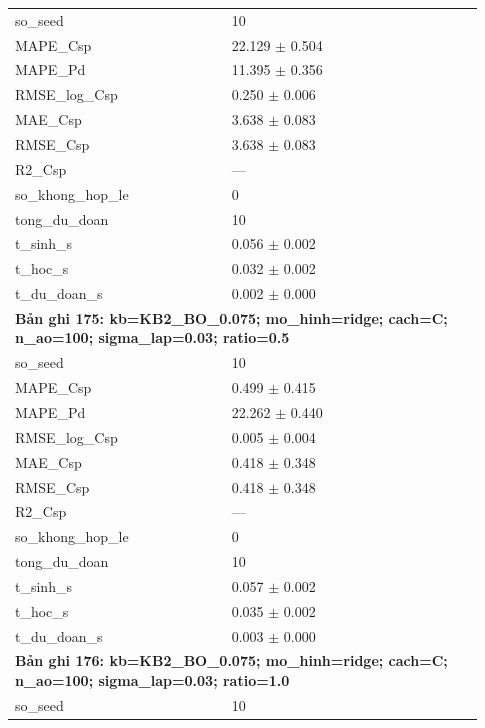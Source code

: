\begin{longtable}{p{0.43\linewidth}p{0.50\linewidth}}
so\_\allowbreak seed & 10 \\
MAPE\_\allowbreak Csp & 22.129 $\pm$ 0.504 \\
MAPE\_\allowbreak Pd & 11.395 $\pm$ 0.356 \\
RMSE\_\allowbreak log\_\allowbreak Csp & 0.250 $\pm$ 0.006 \\
MAE\_\allowbreak Csp & 3.638 $\pm$ 0.083 \\
RMSE\_\allowbreak Csp & 3.638 $\pm$ 0.083 \\
R2\_\allowbreak Csp & — \\
so\_\allowbreak khong\_\allowbreak hop\_\allowbreak le & 0 \\
tong\_\allowbreak du\_\allowbreak doan & 10 \\
t\_\allowbreak sinh\_\allowbreak s & 0.056 $\pm$ 0.002 \\
t\_\allowbreak hoc\_\allowbreak s & 0.032 $\pm$ 0.002 \\
t\_\allowbreak du\_\allowbreak doan\_\allowbreak s & 0.002 $\pm$ 0.000 \\
\midrule
\multicolumn{2}{p{0.95\linewidth}}{\textbf{Bản ghi 175: kb=KB2\_BO\_0.075; mo\_hinh=ridge; cach=C; n\_ao=100; sigma\_lap=0.03; ratio=0.5}} \\
so\_\allowbreak seed & 10 \\
MAPE\_\allowbreak Csp & 0.499 $\pm$ 0.415 \\
MAPE\_\allowbreak Pd & 22.262 $\pm$ 0.440 \\
RMSE\_\allowbreak log\_\allowbreak Csp & 0.005 $\pm$ 0.004 \\
MAE\_\allowbreak Csp & 0.418 $\pm$ 0.348 \\
RMSE\_\allowbreak Csp & 0.418 $\pm$ 0.348 \\
R2\_\allowbreak Csp & — \\
so\_\allowbreak khong\_\allowbreak hop\_\allowbreak le & 0 \\
tong\_\allowbreak du\_\allowbreak doan & 10 \\
t\_\allowbreak sinh\_\allowbreak s & 0.057 $\pm$ 0.002 \\
t\_\allowbreak hoc\_\allowbreak s & 0.035 $\pm$ 0.002 \\
t\_\allowbreak du\_\allowbreak doan\_\allowbreak s & 0.003 $\pm$ 0.000 \\
\midrule
\multicolumn{2}{p{0.95\linewidth}}{\textbf{Bản ghi 176: kb=KB2\_BO\_0.075; mo\_hinh=ridge; cach=C; n\_ao=100; sigma\_lap=0.03; ratio=1.0}} \\
so\_\allowbreak seed & 10 \\

\end{longtable}
